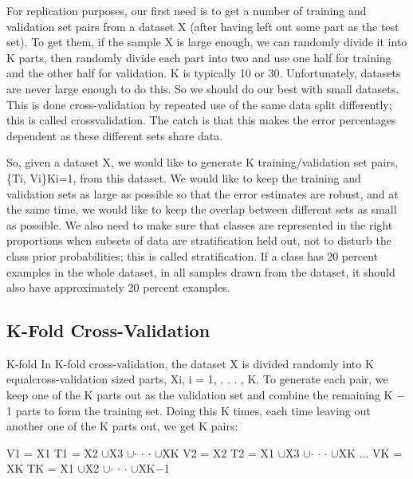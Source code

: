 For replication purposes, our first need is to get a number of training and validation set pairs from a dataset X (after having left out some part as the test set). To get them, if the sample X is large enough, we can randomly divide it into K parts, then randomly divide each part into two and use one half for training and the other half for validation. K is typically 10 or 30. Unfortunately, datasets are never large enough to do this. So we should do our best with small datasets. This is done cross-validation by repeated use of the same data split differently; this is called crossvalidation. The catch is that this makes the error percentages dependent as these different sets share data.

So, given a dataset X, we would like to generate K training/validation set pairs, \{Ti, Vi\}Ki=1, from this dataset. We would like to keep the training and validation sets as large as possible so that the error estimates are robust, and at the same time, we would like to keep the overlap between different sets as small as possible. We also need to make sure that classes are represented in the right proportions when subsets of data are stratification held out, not to disturb the class prior probabilities; this is called stratification. If a class has 20 percent examples in the whole dataset, in all samples drawn from the dataset, it should also have approximately 20 percent examples.

\subsection{K-Fold Cross-Validation}

K-fold In K-fold cross-validation, the dataset X is divided randomly into K equalcross-validation sized parts, Xi, i = 1, . . . , K. To generate each pair, we keep one of the K parts out as the validation set and combine the remaining K $-$1 parts to form the training set. Doing this K times, each time leaving out another one of the K parts out, we get K pairs:

V1 = X1 T1 = X2 $\cup$X3 $\cup$$\cdot$ $\cdot$ $\cdot$ $\cup$XK V2 = X2 T2 = X1 $\cup$X3 $\cup$$\cdot$ $\cdot$ $\cdot$ $\cup$XK ... VK = XK TK = X1 $\cup$X2 $\cup$$\cdot$ $\cdot$ $\cdot$ $\cup$XK$-$1

